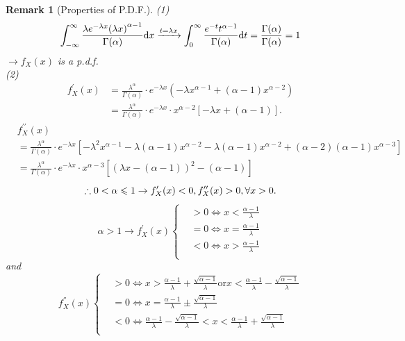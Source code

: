 \documentclass[openany,12pt]{book}
\newtheorem{remark}{Remark}[chapter]
\begin{document}
\begin{remark}[Properties of P.D.F.]
  (1)
  $$
    \int_{-\infty}^{\infty}\frac{\lambda e^{-\lambda x}{(\lambda x)}^{\alpha-1}}{{\Gamma}(\alpha)}\mathrm{d} x\xrightarrow{t=\lambda x}\int_{0}^{\infty}\frac{e^{-t}t^{\alpha-1}}{{\Gamma}(\alpha)}\mathrm{d} t=\frac{{\Gamma}(\alpha)}{{\Gamma}(\alpha)}=1
  $$
  $\to f_X(x)$ is a p.d.f.\\
  (2)
  $$
    \begin{aligned}
      f_X^\prime(x) 
      &=\frac{\lambda^\alpha}{{\Gamma}(\alpha)}\cdot e^{-\lambda x}\left(-\lambda x^{\alpha-1}+\left(\alpha-1\right)x^{\alpha-2}\right) \\
      &=\frac{\lambda^\alpha}{{\Gamma}(\alpha)}\cdot e^{-\lambda x}\cdot x^{\alpha-2}\left[-\lambda x+\left(\alpha-1\right)\right].
    \end{aligned}
  $$
  $$\begin{aligned}
       & f_X^{\prime\prime}(x) \\
       & =\frac{\lambda^\alpha}{{\Gamma}(\alpha)}\cdot e^{-\lambda x}\left[-\lambda^2x^{\alpha-1}-\lambda\left(\alpha-1\right)x^{\alpha-2}-\lambda\left(\alpha-1\right)x^{\alpha-2}+(\alpha-2)\left(\alpha-1\right)x^{\alpha-3}\right] \\
       & =\frac{\lambda^\alpha}{{\Gamma}(\alpha)}\cdot e^{-\lambda x}\cdot x^{\alpha-3}\left[\left(\lambda x-\left(\alpha-1\right)\right)^2-\left(\alpha-1\right)\right]
    \end{aligned}$$
  $$
    \therefore0<\alpha\leqslant1 \to f_X^\prime(x)<0, f_X^{\prime\prime}(x)>0, \forall x>0.
  $$
  \[\alpha > 1 \to f_{X}^{'}(x)\left\{ \begin{aligned}
       & > 0  \Leftrightarrow x < \frac{\alpha - 1}{\lambda} \\
       & = 0 \Leftrightarrow x = \frac{\alpha - 1}{\lambda}  \\
       & < 0 \Leftrightarrow x > \frac{\alpha - 1}{\lambda}  \\
    \end{aligned} \right. \]
  and
  \[f_{X}^{''}(x)\left\{ \begin{aligned}
       & > 0  \Leftrightarrow x > \frac{\alpha - 1}{\lambda} + \frac{\sqrt{\alpha - 1}}{\lambda} \text{or} x < \frac{\alpha - 1}{\lambda} - \frac{\sqrt{\alpha - 1}}{\lambda} \\
       & = 0  \Leftrightarrow x = \frac{\alpha - 1}{\lambda} \pm \frac{\sqrt{\alpha - 1}}{\lambda}                                                                            \\
       & < 0  \Leftrightarrow\frac{\alpha - 1}{\lambda} - \frac{\sqrt{\alpha - 1}}{\lambda} < x < \frac{\alpha - 1}{\lambda} + \frac{\sqrt{\alpha - 1}}{\lambda}              \\
    \end{aligned} \right. \]
\end{remark}
\end{document}

